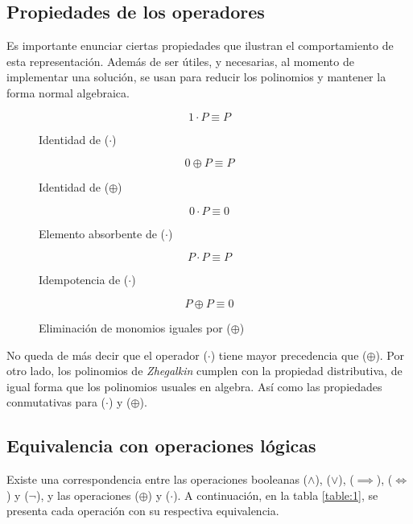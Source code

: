 \subsection{Propiedades de los operadores}

Es importante enunciar ciertas propiedades que ilustran el comportamiento de esta representación. Además de ser útiles, y necesarias, al momento de implementar una solución, se usan para reducir los polinomios y mantener la forma normal algebraica.

\begin{figure}[!ht]
\[1 \cdot P \equiv P\]
\caption{Identidad de ($\cdot$)}
\end{figure}

\begin{figure}[!ht]
\[0 \oplus P \equiv P\]
\caption{Identidad de ($\oplus$)}
\end{figure}

\begin{figure}[!ht]
\[0 \cdot P \equiv 0\]
\caption{Elemento absorbente de ($\cdot$)}
\end{figure}

\newpage

\begin{figure}[!ht]
\[P \cdot P \equiv P\]
\caption{Idempotencia de ($\cdot$)}
\end{figure}

\begin{figure}[!ht]
\[P \oplus P \equiv 0\]
\caption{Eliminación de monomios iguales por ($\oplus$)}
\label{fig:oplus_e}
\end{figure}

No queda de más decir que el operador ($\cdot$) tiene mayor precedencia que ($\oplus$). Por otro lado, los polinomios de \textit{Zhegalkin} cumplen con la propiedad distributiva, de igual forma que los polinomios usuales en algebra. Así como las propiedades conmutativas para ($\cdot$) y ($\oplus$).

\subsection{Equivalencia con operaciones lógicas}

Existe una correspondencia entre las operaciones booleanas ($\land$), ($\lor$), ($\implies$), ($\iff$) y ($\neg$), y las operaciones ($\oplus$) y ($\cdot$). A continuación, en la tabla \ref{table:1}, se presenta cada operación con su respectiva equivalencia.


